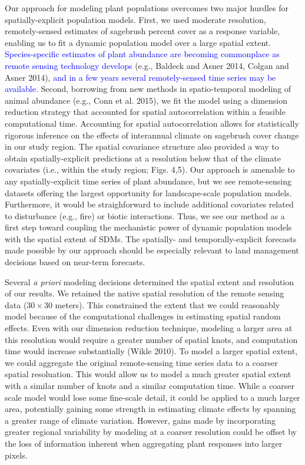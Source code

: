 \documentclass[12pt,]{article}
\begin{document}
Our approach for modeling plant populations overcomes two major hurdles
for spatially-explicit population models. First, we used moderate
resolution, remotely-sensed estimates of sagebrush percent cover as a
response variable, enabling us to fit a dynamic population model over a
large spatial extent.
\textcolor{blue}{Species-specific estimates of plant abundance are becoming commonplace as remote sensing technology develops}
(e.g., Baldeck and Asner 2014, Colgan and Asner 2014),
\textcolor{blue}{and in a few years several remotely-sensed time series may be available.}
Second, borrowing from new methods in spatio-temporal modeling of animal
abundance (e.g., Conn et al. 2015), we fit the model using a dimension
reduction strategy that accounted for spatial autocorrelation within a
feasible computational time. Accounting for spatial autocorrelation
allows for statistically rigorous inference on the effects of
interannual climate on sagebrush cover change in our study region. The
spatial covariance structure also provided a way to obtain
spatially-explicit predictions at a resolution below that of the climate
covariates (i.e., within the study region; Figs. 4,5). Our approach is
amenable to any spatially-explicit time series of plant abundance, but
we see remote-sensing datasets offering the largest opportunity for
landscape-scale population models. Furthermore, it would be
straighforward to include additional covariates related to disturbance
(e.g., fire) or biotic interactions. Thus, we see our method as a first
step toward coupling the mechanistic power of dynamic population models
with the spatial extent of SDMs. The spatially- and temporally-explicit
forecasts made possible by our approach should be especially relevant to
land management decisions based on near-term forecasts.

Several \emph{a priori} modeling decisions determined the spatial extent
and resolution of our results. We retained the native spatial resolution
of the remote sensing data (\(30\times30\) meters). This constrained the
extent that we could reasonably model because of the computational
challenges in estimating spatial random effects. Even with our dimension
reduction technique, modeling a larger area at this resolution would
require a greater number of spatial knots, and computation time would
increase substantially (Wikle 2010). To model a larger spatial extent,
we could aggregate the original remote-sensing time series data to a
coarser spatial resoluation. This would allow us to model a much greater
spatial extent with a similar number of knots and a similar computation
time. While a coarser scale model would lose some fine-scale detail, it
could be applied to a much larger area, potentially gaining some
strength in estimating climate effects by spanning a greater range of
climate variation. However, gains made by incorporating greater regional
variability by modeling at a coarser resolution could be offset by the
loss of information inherent when aggregating plant responses into
larger pixels.
\end{document}
